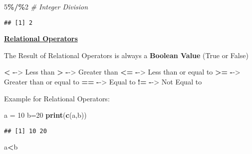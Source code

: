 \documentclass[
]{article}
\newenvironment{Shaded}{\begin{snugshade}}{\end{snugshade}}
\newcommand{\CommentTok}[1]{\textcolor[rgb]{0.56,0.35,0.01}{\textit{#1}}}
\newcommand{\DecValTok}[1]{\textcolor[rgb]{0.00,0.00,0.81}{#1}}
\newcommand{\FunctionTok}[1]{\textcolor[rgb]{0.13,0.29,0.53}{\textbf{#1}}}
\newcommand{\NormalTok}[1]{#1}
\newcommand{\OtherTok}[1]{\textcolor[rgb]{0.56,0.35,0.01}{#1}}
\newcommand{\SpecialCharTok}[1]{\textcolor[rgb]{0.81,0.36,0.00}{\textbf{#1}}}
\begin{document}
\begin{Shaded}
\begin{Highlighting}[]
\DecValTok{5}\SpecialCharTok{\%/\%}\DecValTok{2} \CommentTok{\# Integer Division}
\end{Highlighting}
\end{Shaded}

\begin{verbatim}
## [1] 2
\end{verbatim}

\ul{\textbf{Relational Operators}}

The Result of Relational Operators is always a \textbf{Boolean Value}
(True or False)

\begin{Shaded}
\begin{Highlighting}[]
\SpecialCharTok{\textless{}}  \SpecialCharTok{{-}}\OtherTok{{-}\textgreater{}}\NormalTok{ Less than }
\SpecialCharTok{\textgreater{}}  \SpecialCharTok{{-}}\OtherTok{{-}\textgreater{}}\NormalTok{ Greater than}
\SpecialCharTok{\textless{}=} \SpecialCharTok{{-}}\OtherTok{{-}\textgreater{}}\NormalTok{ Less than or equal to}
\SpecialCharTok{\textgreater{}=} \SpecialCharTok{{-}}\OtherTok{{-}\textgreater{}}\NormalTok{ Greater than or equal to}
\SpecialCharTok{==} \SpecialCharTok{{-}}\OtherTok{{-}\textgreater{}}\NormalTok{ Equal to }
\SpecialCharTok{!=} \SpecialCharTok{{-}}\OtherTok{{-}\textgreater{}}\NormalTok{ Not Equal to }
\end{Highlighting}
\end{Shaded}

Example for Relational Operators:

\begin{Shaded}
\begin{Highlighting}[]
\NormalTok{a }\OtherTok{=} \DecValTok{10}
\NormalTok{b}\OtherTok{=}\DecValTok{20}
\FunctionTok{print}\NormalTok{(}\FunctionTok{c}\NormalTok{(a,b))}
\end{Highlighting}
\end{Shaded}

\begin{verbatim}
## [1] 10 20
\end{verbatim}

\begin{Shaded}
\begin{Highlighting}[]
\NormalTok{a}\SpecialCharTok{\textless{}}\NormalTok{b}
\end{Highlighting}
\end{Shaded}
\end{document}
